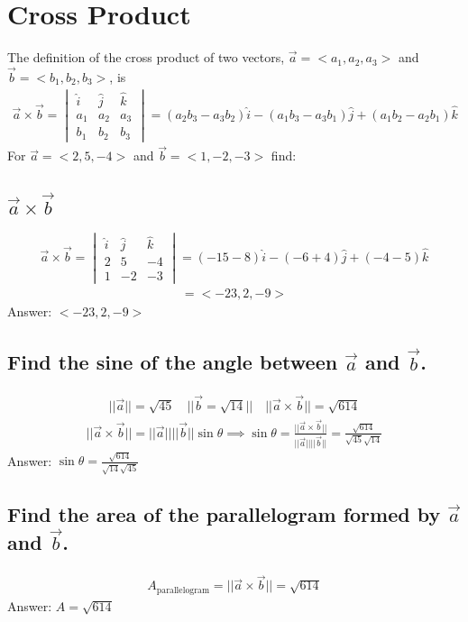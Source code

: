 \documentclass{article}
\begin{document}
\section{Cross Product}
The definition of the cross product of two vectors, $\vec{a} = <a_1, a_2, a_3>$ and $\vec{b} = <b_1, b_2, b_3>$, is
\begin{align*}
	\vec{a} \times \vec{b} = 
	\begin{vmatrix}
		\hat{i} & \hat{j} & \hat{k} \\
		a_1 & a_2 & a_3 \\
		b_1 & b_2 & b_3
	\end{vmatrix}
	= (a_2 b_3 - a_3 b_2)\hat{i} - (a_1 b_3 - a_3 b_1)\hat{j} + (a_1 b_2 - a_2 b_1)\hat{k}
\end{align*}
For $\vec{a} = <2,5,-4>$ and $\vec{b} = <1, -2, -3>$ find:
\subsection{$\vec{a} \times \vec{b}$}
\begin{align*}
	\vec{a} \times \vec{b} = 
	\begin{vmatrix}
		\hat{i} & \hat{j} & \hat{k} \\
		2 & 5 & -4 \\
		1 & -2 & -3
	\end{vmatrix}
	= (-15 - 8)\hat{i} - (-6 + 4)\hat{j} + (-4 - 5)\hat{k}
\end{align*}
\begin{align*}
	= <-23, 2, -9>
\end{align*}
Answer: $<-23, 2, -9>$

\subsection{Find the sine of the angle between $\vec{a}$ and $\vec{b}$.}
\begin{align*}
	|| \vec{a} || = \sqrt{45} \quad || \vec{b} = \sqrt{14} || \quad || \vec{a} \times \vec{b} || = \sqrt{614}
\end{align*}
\begin{align*}
	|| \vec{a} \times \vec{b} || = || \vec{a} || || \vec{b} || \sin{\theta} \implies \sin{\theta} = \frac{|| \vec{a} \times \vec{b} || }{|| \vec{a} || || \vec{b} ||} = \frac{\sqrt{614}}{\sqrt{45} \sqrt{14}}
\end{align*}
Answer: $\sin{\theta} = \frac{\sqrt{614}}{\sqrt{14}\sqrt{45}}$

\subsection{Find the area of the parallelogram formed by $\vec{a}$ and $\vec{b}$.}
\begin{align*}
	A_{\text{parallelogram}} = || \vec{a} \times \vec{b} || = \sqrt{614}
\end{align*}
Answer: $A = \sqrt{614}$
\end{document}
